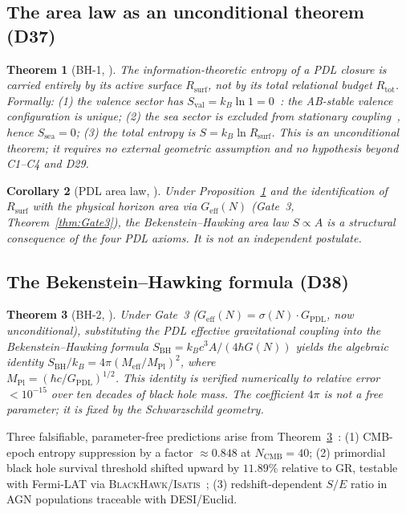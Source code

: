 \documentclass[11pt,a4paper]{article}
\theoremstyle{plain}
\newtheorem{theorem}{Theorem}[section]
\newtheorem{corollary}[theorem]{Corollary}
\theoremstyle{definition}
\theoremstyle{remark}
\newcommand{\Geff}{G_{\mathrm{eff}}}
\newcommand{\GPDL}{G_{\mathrm{PDL}}}
\newcommand{\Rsurf}{R_{\mathrm{surf}}}
\newcommand{\Rtot}{R_{\mathrm{tot}}}
\newcommand{\sigmaN}{\sigma(N)}
\newcommand{\SBH}{S_{\mathrm{BH}}}
\newcommand{\Meff}{M_{\mathrm{eff}}}
\newcommand{\MPl}{M_{\mathrm{Pl}}}
\begin{document}
\subsection{The area law as an unconditional theorem (D37)}
\label{subsec:bharea}
\begin{theorem}[BH-1, \cite{D37}]
\label{thm:BH1}
The information-theoretic entropy of a PDL closure is carried entirely by its active surface $\Rsurf$, not by its total relational budget $\Rtot$. Formally: (1) the valence sector has $S_{\mathrm{val}}=k_B\ln 1=0$~\cite{D29}: the AB-stable valence configuration is unique; (2) the sea sector is excluded from stationary coupling~\cite{D29}, hence $S_{\mathrm{sea}}=0$; (3) the total entropy is $S=k_B\ln\Rsurf$. This is an unconditional theorem; it requires no external geometric assumption and no hypothesis beyond C1--C4 and D29.
\end{theorem}

\begin{corollary}[PDL area law, \cite{D37}]
\label{cor:arealaw}
Under Proposition~\ref{thm:BH1} and the identification of $\Rsurf$ with the physical horizon area via $\Geff(N)$ (Gate~3, Theorem~\ref{thm:Gate3}), the Bekenstein--Hawking area law $S\propto A$ is a structural consequence of the four PDL axioms. It is not an independent postulate.
\end{corollary}

\subsection{The Bekenstein--Hawking formula (D38)}
\label{subsec:bhformula}
\begin{theorem}[BH-2, \cite{D38}]
\label{thm:BH2}
Under Gate~3 ($G_{\mathrm{eff}}(N)=\sigmaN\cdot\GPDL$, now unconditional), substituting the PDL effective gravitational coupling into the Bekenstein--Hawking formula $\SBH=k_Bc^3A/(4\hbar G(N))$ yields the algebraic identity $\SBH/k_B=4\pi(\Meff/\MPl)^2$, where \\ $\MPl=(\hbar c/G_{\mathrm{PDL}})^{1/2}$. This identity is verified numerically to relative error $<10^{-15}$ over ten decades of black hole mass. The coefficient $4\pi$ is not a free parameter; it is fixed by the Schwarzschild geometry.
\end{theorem}

Three falsifiable, parameter-free predictions arise from Theorem~\ref{thm:BH2}~\cite{D38}: (1) CMB-epoch entropy suppression by a factor $\approx 0.848$ at $N_{\mathrm{CMB}}=40$; (2) primordial black hole survival threshold shifted upward by $11.89\%$ relative to GR, testable with Fermi-LAT via \textsc{BlackHawk}/\textsc{Isatis}~\cite{D45}; (3) redshift-dependent $S/E$ ratio in AGN populations traceable with DESI/Euclid.
\end{document}
